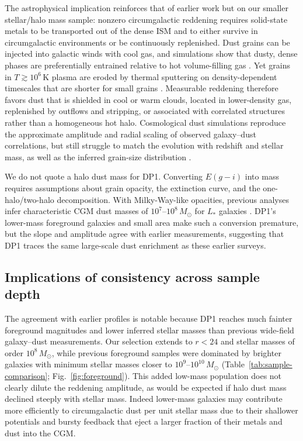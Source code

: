 \documentclass[linenumbers, twocolumn]{aastex701}
\begin{document}
The astrophysical implication reinforces that of earlier work but on our smaller stellar/halo mass sample: nonzero circumgalactic reddening requires solid-state metals to be transported out of the dense ISM and to either survive in circumgalactic environments or be continuously replenished.
Dust grains can be injected into galactic winds with cool gas, and simulations show that dusty, dense phases are preferentially entrained relative to hot volume-filling gas \citep{kannan2021,chenOh2024}.
Yet grains in $T\gtrsim10^6$\,K plasma are eroded by thermal sputtering on density-dependent timescales that are shorter for small grains \citep{draine1979,tsai1995,dwek1992}.
Measurable reddening therefore favors dust that is shielded in cool or warm clouds, located in lower-density gas, replenished by outflows and stripping, or associated with correlated structures rather than a homogeneous hot halo.
Cosmological dust simulations reproduce the approximate amplitude and radial scaling of observed galaxy--dust correlations, but still struggle to match the evolution with redshift and stellar mass, as well as the inferred grain-size distribution \citep{mckinnon2017,aoyama2018}.

We do not quote a halo dust mass for DP1.
Converting $E(g-i)$ into mass requires assumptions about grain opacity, the extinction curve, and the one-halo/two-halo decomposition.
With Milky-Way-like opacities, previous analyses infer characteristic CGM dust masses of $10^7$--$10^8\,M_\odot$ for $L_*$ galaxies \citep{menard2010,peek2015,genc2025}.
DP1's lower-mass foreground galaxies and small area make such a conversion premature, but the slope and amplitude agree with earlier measurements, suggesting that DP1 traces the same large-scale dust enrichment as these earlier surveys.


\subsection{Implications of consistency across sample depth}

The agreement with earlier profiles is notable because DP1 reaches much fainter foreground magnitudes and lower inferred stellar masses than previous wide-field galaxy--dust measurements.
Our selection extends to $r<24$ and stellar masses of order $10^8\,M_\odot$, while previous foreground samples were dominated by brighter galaxies with minimum stellar masses closer to $10^9$--$10^{10}\,M_\odot$ (Table~\ref{tab:sample-comparison}; Fig.~\ref{fig:foreground}).
This added low-mass population does not clearly dilute the reddening amplitude, as would be expected if halo dust mass declined steeply with stellar mass.
Indeed lower-mass galaxies may contribute more efficiently to circumgalactic dust per unit stellar mass due to their shallower potentials and bursty feedback that eject a larger fraction of their metals and dust into the CGM.
\end{document}
